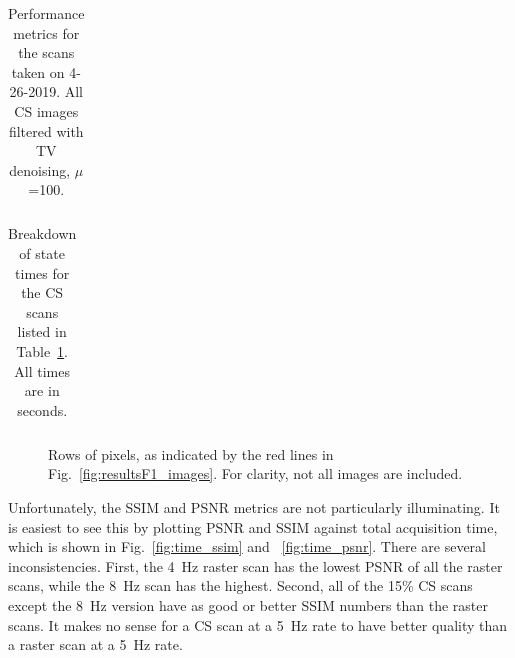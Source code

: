 \documentclass[twocolumn,oneside]{IEEEtran/IEEEtran}
\begin{document}
\begin{table}[t!]
  \centering
  \caption{Performance metrics for the scans taken on 4-26-2019. All CS images
    filtered with TV denoising, $\mu$=100.}
  \begin{tabular}{cccccc}
    
  \end{tabular}
  \label{tab:rast_vs_cs_v1}
\end{table}

\begin{table}[t!]
  \centering
  \caption{Breakdown of state times for the CS scans listed in
    Table~\ref{tab:rast_vs_cs_v1}. All times are in seconds.}
  \label{tab:final_state_times}
  \begin{tabular}{ccccccc}
    
  \end{tabular}
\end{table}

\begin{figure}[t!]
  
  \caption{Rows of pixels, as indicated by the red lines in
    Fig.~\ref{fig:resultsF1_images}. For clarity, not all images are included.}
  \label{fig:pixel_rows}
\end{figure}

Unfortunately, the SSIM and PSNR metrics are not particularly illuminating. It
is easiest to see this by plotting PSNR and SSIM against total acquisition time,
which is shown in Fig.~\ref{fig:time_ssim} and ~\ref{fig:time_psnr}. There are several
inconsistencies. First, the 4~Hz raster scan has the lowest PSNR of all the
raster scans, while the 8~Hz scan has the highest. Second, all of the 15\% CS
scans except the 8~Hz version have as good or better SSIM numbers than the
raster scans. It makes no sense for a CS scan at a 5~Hz rate to have better
quality than a raster scan at a 5~Hz rate.

\end{document}
